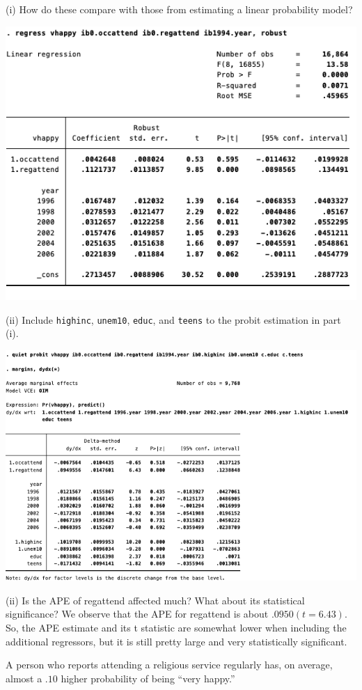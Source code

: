\documentclass[
  10pt,
  ignorenonframetext,
]{beamer}
\begin{document}
\begin{frame}{(i) How do these compare with those from estimating a
\quad linear probability model?}
\protect\hypertarget{i-how-do-these-compare-with-those-from-estimating-a-linear-probability-model}{}
\begin{center}\includegraphics[width=0.8\linewidth]{pictures/ex2-LPM} \end{center}
\end{frame}

\begin{frame}{(ii) Include \texttt{highinc}, \texttt{unem10},
\texttt{educ}, and \texttt{teens} to the \quad probit estimation in part
(i).}
\protect\hypertarget{ii-include-highinc-unem10-educ-and-teens-to-the-probit-estimation-in-part-i.}{}
\begin{center}\includegraphics[width=0.9\linewidth]{pictures/ex2-PROBIT-APE-add4ctrls} \end{center}
\end{frame}

\begin{frame}{(ii) Is the APE of regattend affected much? What about its
statistical significance?}
\protect\hypertarget{ii-is-the-ape-of-regattend-affected-much-what-about-its-statistical-significance}{}
We observe that the APE for regattend is about \(.0950 (t = 6.43)\). So,
the APE estimate and its t statistic are somewhat lower when including
the additional regressors, but it is still pretty large and very
statistically significant.

A person who reports attending a religious service regularly has, on
average, almost a \(.10\) higher probability of being ``very happy.''
\end{frame}
\end{document}
